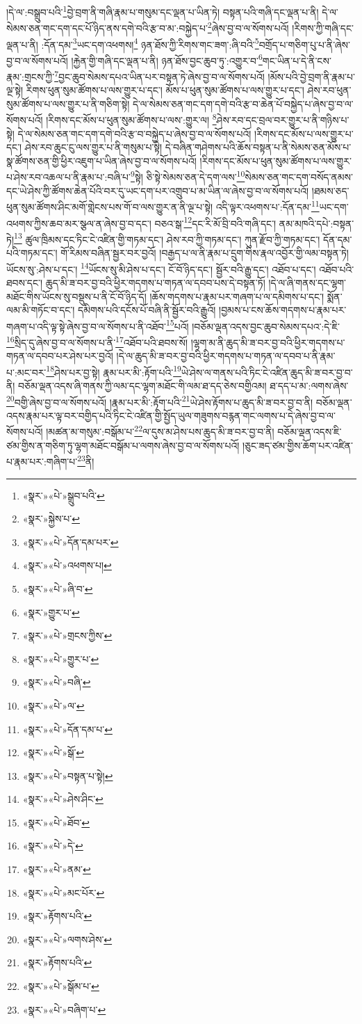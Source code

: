 །དེ་ལ་:བསྒྲུབ་པའི་\footnote{«སྣར་»«པེ་»སྒྲུབ་པའི་}བྱེ་བྲག་ནི་གཞི་རྣམ་པ་གསུམ་དང་ལྡན་པ་ཡིན་ཏེ། བསྟན་པའི་གཞི་དང་ལྡན་པ་ནི། དེ་ལ་སེམས་ཅན་གང་དག་དང་པོ་ཉིད་ནས་དགེ་བའི་རྩ་བ་མ་:བསྐྱེད་པ་\footnote{«སྣར་»སྐྱེས་པ་}ཞེས་བྱ་བ་ལ་སོགས་པའོ། །རིགས་ཀྱི་གཞི་དང་ལྡན་པ་ནི། :དོན་དམ་\footnote{«སྣར་»«པེ་»དོན་དམ་པར་}ཡང་དག་འཕགས།\footnote{«སྣར་»«པེ་»འཕགས་པ།} ཉན་ཐོས་ཀྱི་རིགས་གང་ཟག་:ཞི་བའི་\footnote{«སྣར་»«པེ་»ཞི་བ་}བགྲོད་པ་གཅིག་པུ་པ་ནི་ཞེས་བྱ་བ་ལ་སོགས་པའོ། །རྐྱེན་གྱི་གཞི་དང་ལྡན་པ་ནི། ཉན་ཐོས་བྱང་ཆུབ་ཏུ་:འགྱུར་བ་\footnote{«སྣར་»གྱུར་པ་}གང་ཡིན་པ་དེ་ནི་ངས་རྣམ་:གྲངས་ཀྱི་\footnote{«སྣར་»«པེ་»གྲངས་ཀྱིས་}བྱང་ཆུབ་སེམས་དཔའ་ཡིན་པར་བསྟན་ཏེ་ཞེས་བྱ་བ་ལ་སོགས་པའོ། །མོས་པའི་བྱེ་བྲག་ནི་རྣམ་པ་ལྔ་སྟེ། རིགས་ཕུན་སུམ་ཚོགས་པ་ལས་གྱུར་པ་དང་། མོས་པ་ཕུན་སུམ་ཚོགས་པ་ལས་གྱུར་པ་དང་། ཤེས་རབ་ཕུན་སུམ་ཚོགས་པ་ལས་གྱུར་པ་ནི་གཅིག་སྟེ། དེ་ལ་སེམས་ཅན་གང་དག་དགེ་བའི་རྩ་བ་ཆེན་པོ་བསྐྱེད་པ་ཞེས་བྱ་བ་ལ་སོགས་པའོ། །རིགས་དང་མོས་པ་ཕུན་སུམ་ཚོགས་པ་ལས་:གྱུར་ལ། \footnote{«སྣར་»«པེ་»གྱུར་པ་}ཤེས་རབ་དང་བྲལ་བར་གྱུར་པ་ནི་གཉིས་པ་སྟེ། དེ་ལ་སེམས་ཅན་གང་དག་དགེ་བའི་རྩ་བ་བསྐྱེད་པ་ཞེས་བྱ་བ་ལ་སོགས་པའོ། །རིགས་དང་མོས་པ་ལས་གྱུར་པ་དང་། ཤེས་རབ་ཆུང་ངུ་ལས་གྱུར་པ་ནི་གསུམ་པ་སྟེ། དེ་བཞིན་གཤེགས་པའི་ཆོས་བསྟན་པ་ནི་སེམས་ཅན་མོས་པ་སྣ་ཚོགས་ཅན་གྱི་ཕྱིར་འཇུག་པ་ཡིན་ཞེས་བྱ་བ་ལ་སོགས་པའོ། །རིགས་དང་མོས་པ་ཕུན་སུམ་ཚོགས་པ་ལས་གྱུར་པ་ཤེས་རབ་འཆལ་པ་ནི་རྣམ་པ་:བཞི་པ་\footnote{«སྣར་»«པེ་»བཞི་}སྟེ། ཅི་སྟེ་སེམས་ཅན་དེ་དག་ལས་\footnote{«སྣར་»«པེ་»ལ་}སེམས་ཅན་གང་དག་བསོད་ནམས་དང་ཡེ་ཤེས་ཀྱི་ཚོགས་ཆེན་པོའི་བར་དུ་ཡང་དག་པར་འགྲུབ་པ་མ་ཡིན་ལ་ཞེས་བྱ་བ་ལ་སོགས་པའོ། །ཐམས་ཅད་ཕུན་སུམ་ཚོགས་ཤིང་མགོ་གླེངས་པས་གོ་བ་ལས་གྱུར་ན་ནི་ལྔ་པ་སྟེ། འདི་ལྟར་འཕགས་པ་:དོན་དམ་\footnote{«སྣར་»«པེ་»དོན་དམ་པ་}ཡང་དག་འཕགས་ཀྱིས་ཆབ་མར་སྩལ་ན་ཞེས་བྱ་བ་དང་། བཅའ་སྒ་\footnote{«སྣར་»«པེ་»སྒོ་}དང་རི་མོ་བྲི་བའི་གཞི་དང་། ནམ་མཁའི་དཔེ་:བསྟན་ཏེ།\footnote{«སྣར་»«པེ་»བསྟན་པ་སྟེ།} ཚུལ་ཁྲིམས་དང་ཏིང་ངེ་འཛིན་གྱི་གཏམ་དང་། ཤེས་རབ་ཀྱི་གཏམ་དང་། ཀུན་རྫོབ་ཀྱི་གཏམ་དང་། དོན་དམ་པའི་གཏམ་དང་། གོ་རིམས་བཞིན་སྦྱར་བར་བྱའོ། །བརྒྱད་པ་ལ་ནི་རྣམ་པ་དྲུག་གིས་རྣལ་འབྱོར་གྱི་ལམ་བསྟན་ཏེ། ཡོངས་སུ་:ཤེས་པ་དང་། \footnote{«སྣར་»«པེ་»ཤེས་ཤིང་}ཡོངས་སུ་མི་ཤེས་པ་དང་། ངོ་བོ་ཉིད་དང་། སྦྱོར་བའི་རྒྱུ་དང་། འཐོབ་པ་དང་། འཐོབ་པའི་ཐབས་དང་། ཆུད་མི་ཟ་བར་བྱ་བའི་ཕྱིར་གདགས་པ་གཏན་ལ་དབབ་པས་དེ་བསྟན་ཏོ། །དེ་ལ་ཞི་གནས་དང་ལྷག་མཐོང་གིས་ཡོངས་སུ་བསྡུས་པ་ནི་ངོ་བོ་ཉིད་དོ། །ཆོས་གདགས་པ་རྣམ་པར་གཞག་པ་ལ་དམིགས་པ་དང་། སྨོན་ལམ་མི་གཏོང་བ་དང་། དམིགས་པའི་དངོས་པོ་བཞི་ནི་སྦྱོར་བའི་རྒྱུའོ། །བྱམས་པ་ངས་ཆོས་གདགས་པ་རྣམ་པར་གཞག་པ་འདི་ལྟ་སྟེ་ཞེས་བྱ་བ་ལ་སོགས་པ་ནི་འཐོབ་\footnote{«སྣར་»«པེ་»ཐོབ་}པའོ། །བཅོམ་ལྡན་འདས་བྱང་ཆུབ་སེམས་དཔའ་:དེ་ཇི་\footnote{«སྣར་»«པེ་»དེ་}སྲིད་དུ་ཞེས་བྱ་བ་ལ་སོགས་པ་ནི་\footnote{«སྣར་»«པེ་»ནམ་}འཐོབ་པའི་ཐབས་སོ། །ལྷག་མ་ནི་ཆུད་མི་ཟ་བར་བྱ་བའི་ཕྱིར་གདགས་པ་གཏན་ལ་དབབ་པར་ཤེས་པར་བྱའོ། །དེ་ལ་ཆུད་མི་ཟ་བར་བྱ་བའི་ཕྱིར་གདགས་པ་གཏན་ལ་དབབ་པ་ནི་རྣམ་པ་:མང་བར་\footnote{«སྣར་»«པེ་»མང་པོར་}ཤེས་པར་བྱ་སྟེ། རྣམ་པར་མི་:རྟོག་པའི་\footnote{«སྣར་»རྟོགས་པའི་}ཡེ་ཤེས་ལ་གནས་པའི་ཏིང་ངེ་འཛིན་ཆུད་མི་ཟ་བར་བྱ་བ་ནི། བཅོམ་ལྡན་འདས་ཞི་གནས་ཀྱི་ལམ་དང་ལྷག་མཐོང་གི་ལམ་ཐ་དད་ཅེས་བགྱིའམ། ཐ་དད་པ་མ་:ལགས་ཞེས་\footnote{«སྣར་»«པེ་»ལགས་ཤེས་}བགྱི་ཞེས་བྱ་བ་ལ་སོགས་པའོ། །རྣམ་པར་མི་:རྟོག་པའི་\footnote{«སྣར་»རྟོགས་པའི་}ཡེ་ཤེས་རྟོགས་པ་ཆུད་མི་ཟ་བར་བྱ་བ་ནི། བཅོམ་ལྡན་འདས་རྣམ་པར་ལྟ་བར་བགྱིད་པའི་ཏིང་ངེ་འཛིན་གྱི་སྤྱོད་ཡུལ་གཟུགས་བརྙན་གང་ལགས་པ་དེ་ཞེས་བྱ་བ་ལ་སོགས་པའོ། །མཚན་མ་གསུམ་:བསྒོམ་པ་\footnote{«སྣར་»«པེ་»སྒོམ་པ་}ལ་དུས་མ་ཤེས་པས་ཆུད་མི་ཟ་བར་བྱ་བ་ནི། བཅོམ་ལྡན་འདས་ཇི་ཙམ་གྱིས་ན་གཅིག་ཏུ་ལྷག་མཐོང་བསྒོམ་པ་ལགས་ཞེས་བྱ་བ་ལ་སོགས་པའོ། །ཅུང་ཟད་ཙམ་གྱིས་ཆོག་པར་འཛིན་པ་རྣམ་པར་:གཞིག་པ་\footnote{«སྣར་»«པེ་»བཞིག་པ་}ནི། 